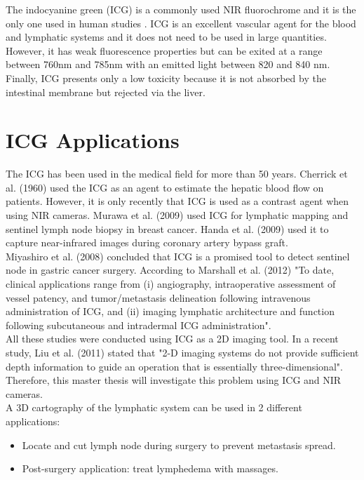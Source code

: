 The indocyanine green (ICG) is a commonly used NIR fluorochrome and it is the only one used in human studies \cite{marshall_near-infrared_2010}. ICG is an excellent vascular agent for the blood and lymphatic systems and it does not need to be used in large quantities. However, it has weak fluorescence properties but can be exited at a range between 760nm and 785nm with an emitted light between 820 and 840 nm. \\

Finally, ICG presents only a low toxicity \cite{m_adverse_1994} because it is not absorbed by the intestinal membrane but rejected via the liver.

\section{ICG Applications}
\label{sec: ICG Applications}
The ICG has been used in the medical field for more than 50 years. Cherrick et al. (1960) \cite{cherrick_indocyanine_1960} used the ICG as an agent to estimate the hepatic blood flow on patients.  However, it is only recently that ICG is used as a contrast agent when using NIR cameras. Murawa et al. (2009) \cite{murawa_sentinel_2009} used ICG for lymphatic mapping and sentinel lymph node biopsy in breast cancer. Handa et al. (2009) \cite{handa_preliminary_2009} used it to capture near-infrared images during coronary artery bypass graft. \\

Miyashiro et al. (2008) \cite{miyashiro_detection_2008} concluded that ICG is a promised tool to detect sentinel node in gastric cancer surgery. According to Marshall et al. (2012) \cite{marshall_near-infrared_2010} "To date, clinical applications range from (i) angiography, intraoperative assessment of vessel patency, and tumor/metastasis delineation following intravenous administration of ICG, and (ii) imaging lymphatic architecture and function following subcutaneous and intradermal ICG administration".\\

All these studies were conducted using ICG as a 2D imaging tool. In a recent study, Liu et al. (2011) \cite{liu_hands-free_2011} stated that "2-D imaging systems do not provide sufficient depth information to guide an operation that is essentially three-dimensional". Therefore, this master thesis will investigate this problem using ICG and NIR cameras. \\

A 3D cartography of the lymphatic system can be used in 2 different applications:
\begin{itemize}
  \item Locate and cut lymph node during surgery to prevent metastasis spread.
  \item Post-surgery application: treat lymphedema with massages. 
\end{itemize}

